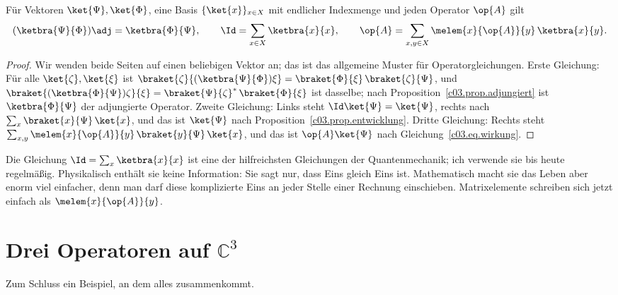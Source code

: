 \begin{proposition}\label{c03.prop.ketbra}
  Für Vektoren $\ket{\Psi}, \ket{\Phi}$, eine Basis $\{\ket{x}\}_{x \in X}$ mit endlicher
  Indexmenge und jeden Operator $\op{A}$ gilt
  \begin{equation}\label{c03.eq.ketbra}
    (\ketbra{\Psi}{\Phi})\adj = \ketbra{\Phi}{\Psi} ,
    \qquad
    \Id = \sum_{x \in X} \ketbra{x}{x} ,
    \qquad
    \op{A} = \sum_{x, y \in X} \melem{x}{\op{A}}{y}\, \ketbra{x}{y} .
  \end{equation}
\end{proposition}
\begin{proof}
  Wir wenden beide Seiten auf einen beliebigen Vektor an; das ist das allgemeine Muster für
  Operatorgleichungen. Erste Gleichung: Für alle $\ket{\zeta}, \ket{\xi}$ ist
  $\braket{\zeta}{(\ketbra{\Psi}{\Phi})\xi} = \braket{\Phi}{\xi}\, \braket{\zeta}{\Psi}$, und
  $\braket{(\ketbra{\Phi}{\Psi})\zeta}{\xi} = \braket{\Psi}{\zeta}^*\, \braket{\Phi}{\xi}$ ist
  dasselbe; nach Proposition~\ref{c03.prop.adjungiert} ist $\ketbra{\Phi}{\Psi}$ der adjungierte
  Operator. Zweite Gleichung: Links steht $\Id\ket{\Psi} = \ket{\Psi}$, rechts nach
   $\sum_x \braket{x}{\Psi}\, \ket{x}$, und das ist $\ket{\Psi}$ nach
  Proposition~\ref{c03.prop.entwicklung}. Dritte Gleichung: Rechts steht
  $\sum_{x,y} \melem{x}{\op{A}}{y}\, \braket{y}{\Psi}\, \ket{x}$, und das ist $\op{A}\ket{\Psi}$
  nach Gleichung~\eqref{c03.eq.wirkung}.
\end{proof}

Die Gleichung $\Id = \sum_x \ketbra{x}{x}$ ist eine der hilfreichsten Gleichungen der
Quantenmechanik; ich verwende sie bis heute regelmäßig. Physikalisch enthält sie keine
Information: Sie sagt nur, dass Eins gleich Eins ist. Mathematisch macht sie das Leben aber
enorm viel einfacher, denn man darf diese komplizierte Eins an jeder Stelle einer Rechnung
einschieben. Matrixelemente schreiben sich jetzt einfach als $\melem{x}{\op{A}}{y}$.

\section{Drei Operatoren auf $\mathbb{C}^3$}\label{c03.s12}

Zum Schluss ein Beispiel, an dem alles zusammenkommt.

